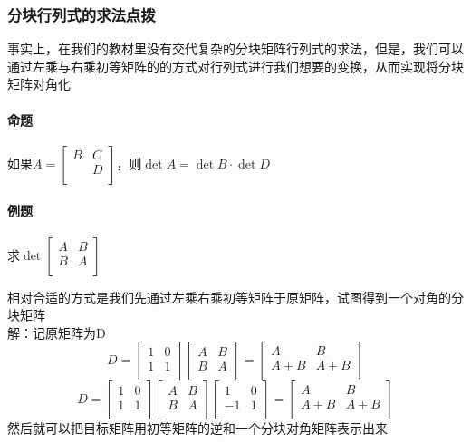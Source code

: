 \documentclass{article}
\begin{document}
\begin{CJK}{UTF8}{gkai}
\subsubsection{分块行列式的求法点拨}
事实上，在我们的教材里没有交代复杂的分块矩阵行列式的求法，但是，我们可以通过左乘与右乘初等矩阵的的方式对行列式进行我们想要的变换，从而实现将分块矩阵对角化\\

\paragraph{命题\\}
如果$A=\begin{bmatrix}
B&C\\
&D\\
\end{bmatrix}$，则$\det A= \det B\cdot \det D$

\paragraph{例题\\}
求$\det\begin{bmatrix}
    A&B\\
    B&A\\
\end{bmatrix}$

相对合适的方式是我们先通过左乘右乘初等矩阵于原矩阵，试图得到一个对角的分块矩阵\\
解：记原矩阵为D\\
\[D=\begin{bmatrix}
    1&0\\
    1&1\\
\end{bmatrix}
\begin{bmatrix}
    A&B\\
    B&A\\
\end{bmatrix}
=
\begin{bmatrix}
    A&B\\
    A+B&A+B\\
\end{bmatrix}\]
\[D=\begin{bmatrix}
    1&0\\
    1&1\\
\end{bmatrix}
\begin{bmatrix}
    A&B\\
    B&A\\
\end{bmatrix}
\begin{bmatrix}
    1&0\\
    -1&1\\
\end{bmatrix}
=
\begin{bmatrix}
    A&B\\
    A+B&A+B\\
\end{bmatrix}
\]
然后就可以把目标矩阵用初等矩阵的逆和一个分块对角矩阵表示出来\\


\end{CJK}
\end{document}
